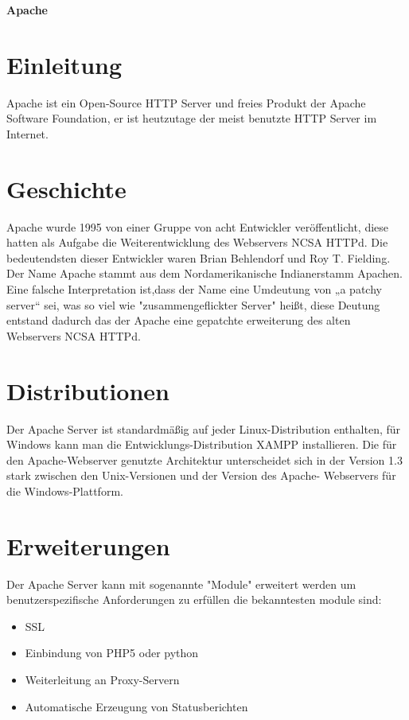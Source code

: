
\begin{center}
\textbf{\LARGE{Apache}}
\end{center}


\section{Einleitung}
Apache ist ein Open-Source HTTP Server und freies Produkt der Apache Software Foundation, er ist heutzutage der meist benutzte HTTP Server  im Internet.

\section{Geschichte}
Apache wurde 1995 von einer Gruppe von acht Entwickler veröffentlicht, diese hatten als Aufgabe die Weiterentwicklung des  Webservers NCSA HTTPd. Die bedeutendsten dieser Entwickler waren Brian Behlendorf und Roy T. Fielding.
Der Name Apache stammt aus dem Nordamerikanische Indianerstamm Apachen. Eine falsche Interpretation ist,dass der Name eine Umdeutung von „a patchy server“ sei, was so viel wie "zusammengeflickter Server" heißt, diese Deutung entstand dadurch das der Apache eine gepatchte erweiterung des alten Webservers NCSA HTTPd.

\section{Distributionen}
Der Apache Server ist standardmäßig auf jeder Linux-Distribution enthalten, für Windows kann man die Entwicklungs-Distribution XAMPP installieren. Die für den Apache-Webserver genutzte Architektur unterscheidet sich in der 
Version 1.3 stark zwischen den Unix-Versionen und der Version des Apache-
Webservers für die Windows-Plattform.

\section{Erweiterungen}
Der Apache Server kann mit sogenannte "Module" erweitert werden um benutzerspezifische
Anforderungen zu erfüllen die bekanntesten module sind: 
\begin{itemize}
\item{SSL}
\item{Einbindung von PHP5 oder python}
\item{Weiterleitung an Proxy-Servern}
\item{Automatische Erzeugung von Statusberichten}
\end{itemize}



